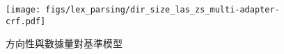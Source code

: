 \begin{figure}[h]
    \centering
    \texttt{[image: figs/lex\_parsing/dir\_size\_las\_zs\_multi-adapter-crf.pdf]}
    \caption{方向性與數據量對基準模型}
    \label{fig:dir-size-las-zs-multi-adapter-crf}
\end{figure}